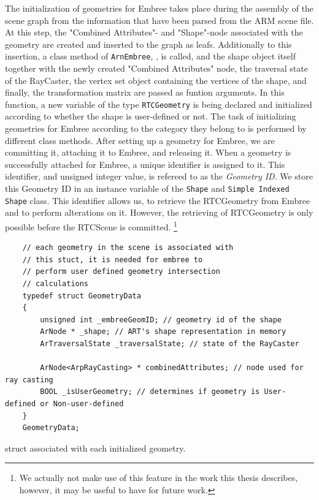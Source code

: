The initialization of geometries for Embree takes place during the assembly of the scene graph from the information that have been parsed from the ARM scene file. At this step, the "Combined Attributes"- and "Shape"-node associated with the geometry are created and inserted to the graph as leafs. Additionally to this insertion, a class method of \texttt{ArnEmbree}, , is called, and the shape object itself together with the newly created "Combined Attributes" node, the traversal state  of the RayCaster, the vertex set object containing the vertices of the shape, and finally, the transformation matrix are passed as funtion arguments. In this function, a new variable of the type \texttt{RTCGeometry} is being declared and initialized according to whether the shape is user-defined or not. The task of initializing geometries for Embree according to the category they belong to is performed by different class methods. After setting up a geometry for Embree, we are committing it, attaching it to Embree, and releasing it. When a geometry is successfully attached for Embree, a unique identifier is assigned to it. This identifier, and unsigned integer value, is refereed to as the \emph{Geometry ID}. We store this Geometry ID in an instance variable of the \texttt{Shape} and \texttt{Simple Indexed Shape} class. This identifier allows us, to retrieve the RTCGeometry from Embree and to perform alterations on it. However, the retrieving of RTCGeometry is only possible before the RTCScene is committed. \footnote{We actually not make use of this feature in the work this thesis describes, however, it may be useful to have for future work.}

\begin{listing} 
	\begin{lstlisting}
	// each geometry in the scene is associated with
	// this stuct, it is needed for embree to
	// perform user defined geometry intersection
	// calculations
	typedef struct GeometryData 
	{
		unsigned int _embreeGeomID; // geometry id of the shape
		ArNode * _shape; // ART's shape representation in memory
		ArTraversalState _traversalState; // state of the RayCaster
		
		ArNode<ArpRayCasting> * combinedAttributes; // node used for ray casting
		BOOL _isUserGeometry; // determines if geometry is User-defined or Non-user-defined
	}
	GeometryData;
	\end{lstlisting}
	\caption{ struct associated with each initialized geometry.}
	\label{lst:geometry_data}
\end{listing}

